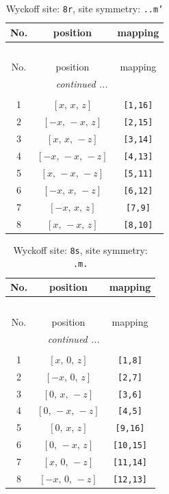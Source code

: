 \documentclass[fleqn,8pt]{jsarticle}
\begin{document}
\begin{longtable}{ccc}
\caption{Wyckoff site: {\tt 8r}, site symmetry: {\tt ..m'}}
 \\
 \hline \hline
No. & position & mapping \\ \hline \endfirsthead

\multicolumn{2}{l}{\tablename\ \thetable{}} \\
 \hline \hline
No. & position & mapping \\ \hline \endhead

 \hline \hline
\multicolumn{2}{r}{\footnotesize\it continued ...} \\ \endfoot

 \hline \hline
\multicolumn{2}{r}{} \\ \endlastfoot

1 & $\left[ x,\, x,\, z \right]$ & {\tt [1,16]} \\ \hline
2 & $\left[ - x,\, - x,\, z \right]$ & {\tt [2,15]} \\ \hline
3 & $\left[ x,\, x,\, - z \right]$ & {\tt [3,14]} \\ \hline
4 & $\left[ - x,\, - x,\, - z \right]$ & {\tt [4,13]} \\ \hline
5 & $\left[ x,\, - x,\, - z \right]$ & {\tt [5,11]} \\ \hline
6 & $\left[ - x,\, x,\, - z \right]$ & {\tt [6,12]} \\ \hline
7 & $\left[ - x,\, x,\, z \right]$ & {\tt [7,9]} \\ \hline
8 & $\left[ x,\, - x,\, z \right]$ & {\tt [8,10]} \\
\end{longtable}
\renewcommand{\arraystretch}{1.2}
\begin{longtable}{ccc}
\caption{Wyckoff site: {\tt 8s}, site symmetry: {\tt .m.}}
 \\
 \hline \hline
No. & position & mapping \\ \hline \endfirsthead

\multicolumn{2}{l}{\tablename\ \thetable{}} \\
 \hline \hline
No. & position & mapping \\ \hline \endhead

 \hline \hline
\multicolumn{2}{r}{\footnotesize\it continued ...} \\ \endfoot

 \hline \hline
\multicolumn{2}{r}{} \\ \endlastfoot

1 & $\left[ x,\, 0,\, z \right]$ & {\tt [1,8]} \\ \hline
2 & $\left[ - x,\, 0,\, z \right]$ & {\tt [2,7]} \\ \hline
3 & $\left[ 0,\, x,\, - z \right]$ & {\tt [3,6]} \\ \hline
4 & $\left[ 0,\, - x,\, - z \right]$ & {\tt [4,5]} \\ \hline
5 & $\left[ 0,\, x,\, z \right]$ & {\tt [9,16]} \\ \hline
6 & $\left[ 0,\, - x,\, z \right]$ & {\tt [10,15]} \\ \hline
7 & $\left[ x,\, 0,\, - z \right]$ & {\tt [11,14]} \\ \hline
8 & $\left[ - x,\, 0,\, - z \right]$ & {\tt [12,13]} \\
\end{longtable}
\end{document}
